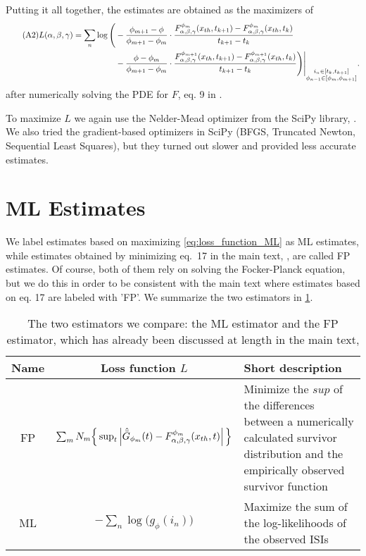 Putting it all together, the estimates are obtained as the maximizers of 
\begin{align}
\tag{A2}
\label{eq:loss_function_ML}
L(\alpha,\beta,{\gamma }) = \sum_n  \log \Bigg(
&-\frac{\phi_{m+1} - \phi}{\phi_{m+1} - \phi_{m}} \cdot 
\frac{F_{\alpha,\beta,{\gamma }}^{\phi_m}({ x_{th} }, t_{k+1}) - F_{\alpha,\beta,{\gamma }}^{\phi_m}({ x_{th} },
t_{k})}{t_{k+1} - t_{k}}
\\&-
\frac{\phi - \phi_{m}}{\phi_{m+1} - \phi_{m}} \cdot 
\frac{F_{\alpha,\beta,{\gamma }}^{\phi_{m+1}}({ x_{th} }, t_{k+1}) - F_{\alpha,\beta,{\gamma }}^{\phi_{m+1}}({ x_{th} },
t_{k})}{t_{k+1} - t_{k}} 
 \Bigg)
 \Bigg|_{\substack{i_n \in [t_k, t_{k+1}] \\
 			 \phi_{n-1} \in [\phi_m, \phi_{m+1}]}} .
 			 \notag
\end{align} 
after numerically solving the PDE for $F$, eq. 9 in \cite{Iolov2013}. 

To maximize $L$ we again use the Nelder-Mead optimizer from the SciPy library,
\cite{scipy}. We also tried the gradient-based optimizers in SciPy (BFGS,
Truncated Newton, Sequential Least Squares), but they turned out slower and
provided less accurate estimates.
  
\section{ML Estimates}
We label estimates based on maximizing \cref{eq:loss_function_ML} as ML
estimates, while estimates obtained by minimizing eq.\ 17 in the main text, \cite{Iolov2013},
are called FP estimates. Of course, both of them rely on solving the
Focker-Planck equation, but we do this in order to be consistent with the main text
where estimates based on eq. 17 are labeled with 'FP'. We summarize the two
estimators in \cref{tab:estimators}. \begin{table} \begin{tabular}{ccp{4cm}}
Name & Loss function $L$ & Short description
\\
\hline FP &$\sum_{m} N_m \Big\{ \sup_{t} \left| { \hat{{ \bar{G} }} }_{\phi_m}(t) -
F^{\phi_m}_{\alpha,\beta,{\gamma }}({ x_{th} },
t) \right| \Big \}$ & Minimize the $sup$ of the  differences between a
numerically calculated survivor distribution and the empirically observed
survivor function
\\
ML & $-\sum_n  \log \Big( g_\phi(i_n)
 \Big)$
& Maximize the sum of the log-likelihoods of the observed ISIs
 		\\
\hline  \end{tabular}
\caption{The two estimators we compare: the ML estimator
and  the FP estimator, which has already been discussed at length in the main text,
\cite{Iolov2013}} \label{tab:estimators} \end{table}

